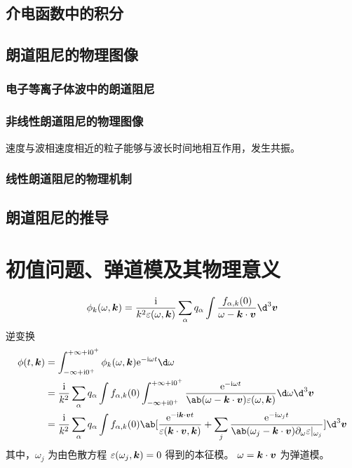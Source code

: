 \subsection{介电函数中的积分}

\subsection{朗道阻尼的物理图像}

\subsubsection{电子等离子体波中的朗道阻尼}

\subsubsection{非线性朗道阻尼的物理图像}

速度与波相速度相近的粒子能够与波长时间地相互作用，发生共振。

\subsubsection{线性朗道阻尼的物理机制}

\subsection{朗道阻尼的推导}

\section{初值问题、弹道模及其物理意义}

\begin{equation}
\phi_k(\omega, \vector{k}) = \frac{\im}{k^2 \varepsilon(\omega, \vector{k})} \sum_\alpha q_\alpha \int \frac{f_{\alpha,k}(0)}{\omega - \vector{k} \cdot \vector{v}} \d^3 \vector{v}
\end{equation}
逆变换
\begin{equation}\begin{aligned}
\phi(t, \vector{k}) &=
\int_{-\infty+\im 0^+}^{+\infty+\im 0^+}
\phi_k(\omega, \vector{k}) \eu^{-\im\omega t} \d \omega \\
&= \frac{\im}{k^2} \sum_\alpha q_\alpha
\int f_{\alpha,k}(0) \int_{-\infty+\im 0^+}^{+\infty+\im 0^+}
    \frac{\eu^{-\im\omega t}}{
        \ab(\omega - \vector{k} \cdot \vector{v})
        \varepsilon(\omega, \vector{k})
    } \d \omega
\d^3 \vector{v} \\
&= \frac{\im}{k^2} \sum_\alpha q_\alpha
\int f_{\alpha,k}(0) \ab[
    \frac{
        \eu^{-\im \vector{k} \cdot \vector{v} t}
    }{\varepsilon(\vector{k} \cdot \vector{v}, \vector{k})}
    + \sum_j \frac{
        \eu^{-\im \omega_j t}
    }{
        \ab(\omega_j - \vector{k} \cdot \vector{v})
        \pdv{\varepsilon}!{\omega}|_{\omega_j}
    }
] \d^3 \vector{v}
\end{aligned}\end{equation}
其中，$\omega_j$ 为由色散方程 $\varepsilon(\omega_j, \bm{k}) = 0$ 得到的本征模。
$\omega = \bm{k} \cdot \bm{v}$ 为弹道模。


